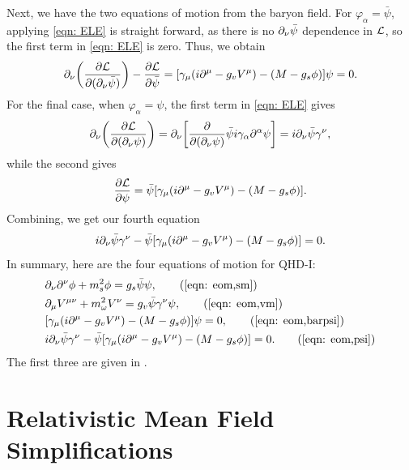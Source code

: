 Next, we have the two equations of motion from the baryon field. For $\varphi_\alpha = \bar\psi$, applying \eqref{eqn: ELE} is straight forward, as there is no $\partial_\nu \bar\psi$ dependence in $\mathcal{L}$, so the first term in \eqref{eqn: ELE} is zero. Thus, we obtain
\begin{align}\label{eqn: eom,barpsi}
    \p_\nu \pqty{\pdv{\Lag}{(\p_\nu \bar\psi)}}  - \pdv{\Lag}{\bar\psi} = \bqty{\gamma_\mu(i\p^\mu - g_v V^\mu) - (M-g_s\phi)} \psi = 0.
\end{align}
For the final case, when $\varphi_\alpha = \psi$, the first term in \eqref{eqn: ELE} gives
\begin{align*}
    \p_\nu \pqty{\pdv{\Lag}{(\p_\nu \psi)}} = \p_\nu\bqty{\pdv{}{(\p_\nu\psi)}\bar\psi i \gamma_\alpha \p^\alpha \psi} = i\p_\nu \bar\psi \gamma^\nu,
\end{align*}
while the second gives
\begin{align*}
    \pdv{\Lag}{\psi} = \bar\psi\bqty{\gamma_\mu(i\p^\mu - g_v V^\mu) - (M-g_s\phi)}.
\end{align*}
Combining, we get our fourth equation
\begin{align}\label{eqn: eom,psi}
    i \p_\nu \bar\psi \gamma^\nu -\bar\psi\bqty{\gamma_\mu(i\p^\mu - g_v V^\mu) - (M-g_s\phi)} = 0.
\end{align}
In summary, here are the four equations of motion for QHD-I:
\begin{align*}
    &\p_\nu \p^\nu \phi + m_s^2\phi = g_s\bar{\psi}\psi,\tag{\ref{eqn: eom,sm}}\\
    &\p_\mu V^{\mu\nu} + m_\omega^2 V^\nu = g_v \bar\psi \gamma^\nu \psi,\tag{\ref{eqn: eom,vm}}\\
    &\bqty{\gamma_\mu(i\p^\mu -g_v V^\mu) - (M-g_s\phi)} \psi = 0,\tag{\ref{eqn: eom,barpsi}}\\
    & i \p_\nu \bar\psi \gamma^\nu -\bar\psi\bqty{\gamma_\mu(i\p^\mu - g_v V^\mu) - (M-g_s\phi)} = 0. \tag{\ref{eqn: eom,psi}}
\end{align*}
The first three are given in \autocite{diener_2008}.

\section{Relativistic Mean Field Simplifications}

